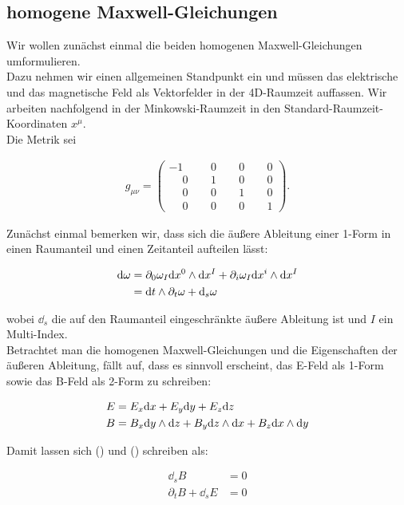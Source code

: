 \subsection{homogene Maxwell-Gleichungen}
Wir wollen zunächst einmal die beiden homogenen Maxwell-Gleichungen umformulieren. \\
Dazu nehmen wir einen allgemeinen Standpunkt ein und müssen das elektrische und das magnetische Feld als Vektorfelder in der 4D-Raumzeit auffassen. Wir arbeiten nachfolgend in der Minkowski-Raumzeit in den Standard-Raumzeit-Koordinaten $x^{\mu}$. \\
Die Metrik sei

\begin{align}
g_{\mu \nu} =
\begin{pmatrix}
-1 & \phantom{-}0 & \phantom{-}0 & \phantom{-}0 \\
\phantom{-}0 & \phantom{-}1 & \phantom{-}0 & \phantom{-}0 \\
\phantom{-}0 & \phantom{-}0 & \phantom{-}1 & \phantom{-}0 \\
\phantom{-}0 & \phantom{-}0 & \phantom{-}0 & \phantom{-}1
\end{pmatrix}.
\end{align}

Zunächst einmal bemerken wir, dass sich die äußere Ableitung einer 1-Form in einen Raumanteil und einen Zeitanteil aufteilen lässt:

\begin{align}
\dd \omega &= \partial_0 \omega_I \dd x^0 \wedge \dd x^{I} + \partial_i \omega_I \dd x^i \wedge \dd x^{I} \notag\\
&= \dd t \wedge \partial_t \omega + \dd_s \omega 
\end{align}

wobei $\dd_s$ die auf den Raumanteil eingeschränkte äußere Ableitung ist und $I$ ein Multi-Index. \\
Betrachtet man die homogenen Maxwell-Gleichungen und die Eigenschaften der äußeren Ableitung, fällt auf, dass es sinnvoll erscheint, das E-Feld als 1-Form sowie das B-Feld als 2-Form zu schreiben:

\begin{align}
E &= E_x \dd x +E_y \dd y + E_z \dd z   \\
B &= B_x \dd y \wedge \dd z + B_y \dd z \wedge \dd x + B_z \dd x \wedge \dd y 
\end{align}

Damit lassen sich () und () schreiben als: 

\begin{align}
\dd_s B &= 0 \\
\partial_t B + \dd_s E &=0
\end{align}

